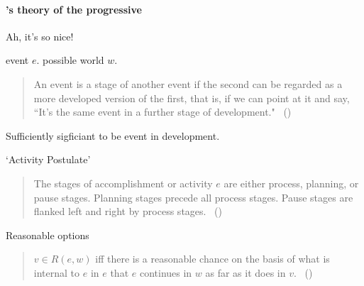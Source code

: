 \paragraph{\citeauthor{Landman:1992wh}'s theory of the progressive}
\nocite{Portner:1998um}

\begin{note}
  Ah, it's so nice!
\end{note}

\begin{note}
  event \(e\).
  possible world \(w\).
\end{note}

\begin{note}
  \begin{quote}
    An event is a stage of another event if the second can be regarded as a more developed version of the first, that is, if we can point at it and say, “It's the same event in a further stage of development."%
        \mbox{ }\hfill\mbox{(\citeyear[23]{Landman:1992wh})}
  \end{quote}
  Sufficiently sigficiant to be event in development.

  `Activity Postulate'
  \begin{quote}
    The stages of accomplishment or activity \(e\) are either process, planning, or pause stages.
    Planning stages precede all process stages.
    Pause stages are flanked left and right by process stages.%
        \mbox{ }\hfill\mbox{(\citeyear[24]{Landman:1992wh})}
  \end{quote}
\end{note}

\begin{note}
  Reasonable options
  \begin{quote}
    \(v \in R(e, w)\) iff there is a reasonable chance on the basis of what is internal to \(e\) in \(e\) that \(e\) continues in \(w\) as far as it does in \(v\).%
        \mbox{ }\hfill\mbox{(\citeyear[26]{Landman:1992wh})}
  \end{quote}
\end{note}

